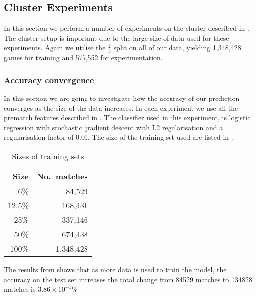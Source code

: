 \subsection{Cluster Experiments}\label{sec:clustertest}
In this section we perform a number of experiments on the cluster described in . The cluster setup is important due to the large size of data used for these experiments. Again we utilise the $\frac{2}{3}$ split on all of our data, yielding 1,348,428 games for training and 577,552 for experimentation.

\subsubsection{Accuracy convergence}
In this section we are going to investigate how the accuracy of our prediction converges as the size of the data increases. In each experiment we use all the prematch features described in . The classifier used in this experiment, is logistic regression with stochastic gradient descent with L2 regularisation and a regularisation factor of 0.01. The size of the training set used are listed in .

\begin{table}[!htb]
  \centering
  \begin{tabular}{|r|r|}
    \hline
    Size   & No.\ matches \\\hline
    6\%    & 84,529\\
    12.5\% & 168,431\\  
    25\%   & 337,146\\  
    50\%   & 674,438\\ 
    100\%  & 1,348,428\\\hline
  \end{tabular}
  \caption{Sizes of training sets}\label{tab:trainingsize}
\end{table}

The results from  shows that as more data is used to train the model, the accuracy on the test set increases the total change from 84529 matches to 134828 matches is $3.86\times10^{-1}\%$

